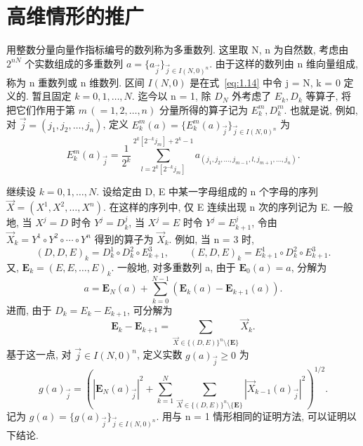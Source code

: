 
\section{高维情形的推广}\label{sec:1.10}
















用整数分量向量作指标编号的数列称为多重数列. 这里取 N, n 为自然数, 考虑由 $2^{nN}$ 个实数组成的多重数列 $a = \{a_{\vec{j}}\}_{\vec{j}\in I(N,0)^{n}}$. 由于这样的数列由 n 维向量组成, 称为 n 重数列或 n 维数列. 区间 $I(N,0)$ 是在式~\eqref{eq:1.14} 中令 j = N, k = 0 定义的. 暂且固定 $k = 0, 1, \ldots, N$. 迄今以 n = 1, 除 $D_{N}$ 外考虑了 $E_{k}, D_{k}$ 等算子, 将把它们作用于第 $m\,(=1, 2, \ldots, n)$ 分量所得的算子记为 $E_{k}^{m}, D_{k}^{m}$. 也就是说, 例如, 对 $\vec{j} = (j_{1}, j_{2}, \ldots, j_{n})$, 定义 $E_{k}^{m}(a) = \{E_{k}^{m}(a)_{\vec{j}}\}_{\vec{j}\in I(N,0)^{n}}$ 为
\[
E_{k}^{m}(a)_{\vec{j}} = \frac{1}{2^{k}}\sum_{l = 2^{k}[2^{-k}j_{m}]}^{2^{k}[2^{-k}j_{m}] + 2^{k} - 1}a_{(j_{1}, j_{2}, \ldots, j_{m-1}, l, j_{m+1}, \ldots, j_{n})}.
\]

继续设 $k = 0, 1, \ldots, N$. 设给定由 D, E 中某一字母组成的 n 个字母的序列 $\vec{X} = (X^{1}, X^{2}, \ldots, X^{n})$. 在这样的序列中, 仅 E 连续出现 n 次的序列记为 E. 一般地, 当 $X^{j} = D$ 时令 $Y^{j} = D_{k}^{j}$, 当 $X^{j} = E$ 时令 $Y^{j} = E_{k+1}^{j}$, 令由 $\vec{X}_{k} = Y^{1} \circ Y^{2} \circ \cdots \circ Y^{n}$ 得到的算子为 $\vec{X}_{k}$. 例如, 当 n = 3 时,
\[
(D, D, E)_{k} = D_{k}^{1} \circ D_{k}^{2} \circ E_{k+1}^{3}, \qquad (E, D, E)_{k} = E_{k+1}^{1} \circ D_{k}^{2} \circ E_{k+1}^{3}.
\]
又, $\mathbf{E}_{k} = (E, E, \ldots, E)_{k}$. 一般地, 对多重数列 a, 由于 $\mathbf{E}_{0}(a) = a$, 分解为
\[
a = \mathbf{E}_{N}(a) + \sum_{k=0}^{N-1}(\mathbf{E}_{k}(a) - \mathbf{E}_{k+1}(a)).
\]
进而, 由于 $D_{k} = E_{k} - E_{k+1}$, 可分解为
\[
\mathbf{E}_{k} - \mathbf{E}_{k+1} = \sum_{\vec{X}\in\{(D,E)\}^{n}\setminus\{\mathbf{E}\}}\vec{X}_{k}.
\]
基于这一点, 对 $\vec{j} \in I(N,0)^{n}$, 定义实数 $g(a)_{\vec{j}} \geq 0$ 为
\[
g(a)_{\vec{j}} = \left(|\mathbf{E}_{N}(a)_{\vec{j}}|^{2} + \sum_{k=1}^{N}\sum_{\vec{X}\in\{(D,E)\}^{n}\setminus\{\mathbf{E}\}}|\vec{X}_{k-1}(a)_{\vec{j}}|^{2}\right)^{1/2}.
\]
记为 $g(a) = \{g(a)_{\vec{j}}\}_{\vec{j}\in I(N,0)^{n}}$. 用与 n = 1 情形相同的证明方法, 可以证明以下结论.

